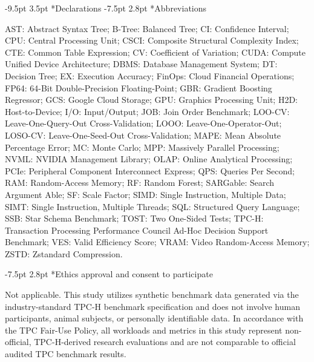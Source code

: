 \documentclass[10pt,a4paper]{article}
\makeatletter
\renewcommand\section{\@startsection{section}{1}{\z@}%
  {-9.5pt \@plus -2pt \@minus -1.5pt}%
  {3.5pt \@plus 1pt}%
  {\normalfont\large\bfseries}}
\renewcommand\subsection{\@startsection{subsection}{2}{\z@}%
  {-7.5pt \@plus -2pt \@minus -1pt}%
  {2.8pt \@plus 1pt}%
  {\normalfont\normalsize\bfseries}}
\makeatother
\begin{document}
\section*{Declarations}
\enlargethispage{1.8\baselineskip}
\vspace{-5pt}
\subsection*{Abbreviations}
{\scriptsize AST: Abstract Syntax Tree; B-Tree: Balanced Tree; CI: Confidence Interval; CPU: Central Processing Unit; CSCI: Composite Structural Complexity Index; CTE: Common Table Expression; CV: Coefficient of Variation; CUDA: Compute Unified Device Architecture; DBMS: Database Management System; DT: Decision Tree; EX: Execution Accuracy; FinOps: Cloud Financial Operations; FP64: 64-Bit Double-Precision Floating-Point; GBR: Gradient Boosting Regressor; GCS: Google Cloud Storage; GPU: Graphics Processing Unit; H2D: Host-to-Device; I/O: Input/Output; JOB: Join Order Benchmark; LOO-CV: Leave-One-Query-Out Cross-Validation; LOOO: Leave-One-Operator-Out; LOSO-CV: Leave-One-Seed-Out Cross-Validation; MAPE: Mean Absolute Percentage Error; MC: Monte Carlo; MPP: Massively Parallel Processing; NVML: NVIDIA Management Library; OLAP: Online Analytical Processing; PCIe: Peripheral Component Interconnect Express; QPS: Queries Per Second; RAM: Random-Access Memory; RF: Random Forest; SARGable: Search Argument Able; SF: Scale Factor; SIMD: Single Instruction, Multiple Data; SIMT: Single Instruction, Multiple Threads; SQL: Structured Query Language; SSB: Star Schema Benchmark; TOST: Two One-Sided Tests; TPC-H: Transaction Processing Performance Council Ad-Hoc Decision Support Benchmark; VES: Valid Efficiency Score; VRAM: Video Random-Access Memory; ZSTD: Zstandard Compression.\par}
\vspace{-5pt}
\subsection*{Ethics approval and consent to participate}
{\scriptsize Not applicable. This study utilizes synthetic benchmark data generated via the industry-standard TPC-H benchmark specification \cite{tpc2022tpch} and does not involve human participants, animal subjects, or personally identifiable data. In accordance with the TPC Fair-Use Policy, all workloads and metrics in this study represent non-official, TPC-H-derived research evaluations and are not comparable to official audited TPC benchmark results.\par}
\vspace{-5pt}
\end{document}
